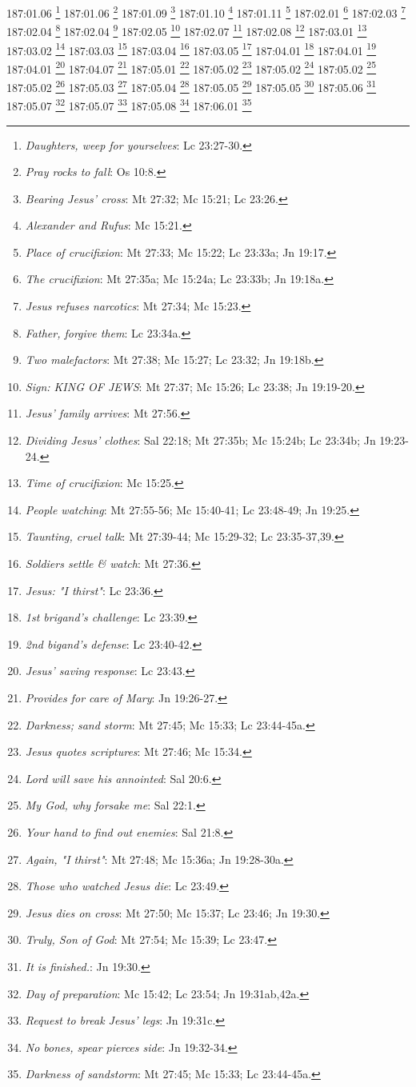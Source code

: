 187:01.06 \footnote{\textit{Daughters, weep for yourselves}: Lc 23:27-30.}
187:01.06 \footnote{\textit{Pray rocks to fall}: Os 10:8.}
187:01.09 \footnote{\textit{Bearing Jesus' cross}: Mt 27:32; Mc 15:21; Lc 23:26.}
187:01.10 \footnote{\textit{Alexander and Rufus}: Mc 15:21.}
187:01.11 \footnote{\textit{Place of crucifixion}: Mt 27:33; Mc 15:22; Lc 23:33a; Jn 19:17.}
187:02.01 \footnote{\textit{The crucifixion}: Mt 27:35a; Mc 15:24a; Lc 23:33b; Jn 19:18a.}
187:02.03 \footnote{\textit{Jesus refuses narcotics}: Mt 27:34; Mc 15:23.}
187:02.04 \footnote{\textit{Father, forgive them}: Lc 23:34a.}
187:02.04 \footnote{\textit{Two malefactors}: Mt 27:38; Mc 15:27; Lc 23:32; Jn 19:18b.}
187:02.05 \footnote{\textit{Sign: KING OF JEWS}: Mt 27:37; Mc 15:26; Lc 23:38; Jn 19:19-20.}
187:02.07 \footnote{\textit{Jesus' family arrives}: Mt 27:56.}
187:02.08 \footnote{\textit{Dividing Jesus' clothes}: Sal 22:18; Mt 27:35b; Mc 15:24b; Lc 23:34b; Jn 19:23-24.}
187:03.01 \footnote{\textit{Time of crucifixion}: Mc 15:25.}
187:03.02 \footnote{\textit{People watching}: Mt 27:55-56; Mc 15:40-41; Lc 23:48-49; Jn 19:25.}
187:03.03 \footnote{\textit{Taunting, cruel talk}: Mt 27:39-44; Mc 15:29-32; Lc 23:35-37,39.}
187:03.04 \footnote{\textit{Soldiers settle & watch}: Mt 27:36.}
187:03.05 \footnote{\textit{Jesus: "I thirst"}: Lc 23:36.}
187:04.01 \footnote{\textit{1st brigand's challenge}: Lc 23:39.}
187:04.01 \footnote{\textit{2nd bigand's defense}: Lc 23:40-42.}
187:04.01 \footnote{\textit{Jesus' saving response}: Lc 23:43.}
187:04.07 \footnote{\textit{Provides for care of Mary}: Jn 19:26-27.}
187:05.01 \footnote{\textit{Darkness; sand storm}: Mt 27:45; Mc 15:33; Lc 23:44-45a.}
187:05.02 \footnote{\textit{Jesus quotes scriptures}: Mt 27:46; Mc 15:34.}
187:05.02 \footnote{\textit{Lord will save his annointed}: Sal 20:6.}
187:05.02 \footnote{\textit{My God, why forsake me}: Sal 22:1.}
187:05.02 \footnote{\textit{Your hand to find out enemies}: Sal 21:8.}
187:05.03 \footnote{\textit{Again, "I thirst"}: Mt 27:48; Mc 15:36a; Jn 19:28-30a.}
187:05.04 \footnote{\textit{Those who watched Jesus die}: Lc 23:49.}
187:05.05 \footnote{\textit{Jesus dies on cross}: Mt 27:50; Mc 15:37; Lc 23:46; Jn 19:30.}
187:05.05 \footnote{\textit{Truly, Son of God}: Mt 27:54; Mc 15:39; Lc 23:47.}
187:05.06 \footnote{\textit{It is finished.}: Jn 19:30.}
187:05.07 \footnote{\textit{Day of preparation}: Mc 15:42; Lc 23:54; Jn 19:31ab,42a.}
187:05.07 \footnote{\textit{Request to break Jesus' legs}: Jn 19:31c.}
187:05.08 \footnote{\textit{No bones, spear pierces side}: Jn 19:32-34.}
187:06.01 \footnote{\textit{Darkness of sandstorm}: Mt 27:45; Mc 15:33; Lc 23:44-45a.}
